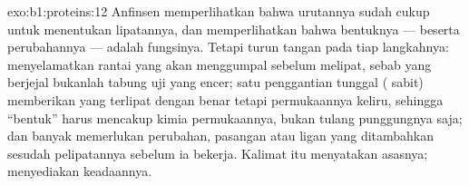 \begin{solution}{exo:b1:proteins:12}
Anfinsen memperlihatkan bahwa urutannya sudah cukup untuk menentukan
lipatannya, dan  memperlihatkan bahwa bentuknya --- beserta
perubahannya --- adalah fungsinya. Tetapi  turun tangan pada tiap
langkahnya:  menyelamatkan rantai yang akan menggumpal
sebelum melipat, sebab  yang berjejal bukanlah tabung uji yang
encer; satu penggantian tunggal ( sabit) memberikan  yang
terlipat dengan benar tetapi permukaannya keliru, sehingga ``bentuk''
harus mencakup kimia permukaannya, bukan tulang punggungnya saja; dan
banyak  memerlukan perubahan, pasangan atau ligan yang
ditambahkan sesudah pelipatannya sebelum ia bekerja. Kalimat itu
menyatakan asasnya;  menyediakan keadaannya.
\end{solution}

